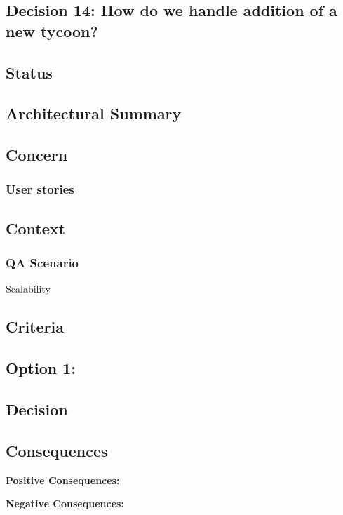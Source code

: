 \subsection{Decision 14: How do we handle addition of a new tycoon?}

\subsection*{Status}

\subsection*{Architectural Summary}


\subsection*{Concern}
\subsubsection*{User stories}

\subsection*{Context}

\subsubsection*{QA Scenario} %
Scalability
\subsection*{Criteria}
\begin{itemize}
\end{itemize}

\subsection*{Option 1:}


\subsection*{Decision}

\subsection*{Consequences}
\textbf{Positive Consequences:}
\begin{itemize}
\end{itemize}
\textbf{Negative Consequences:}
\begin{itemize}
\end{itemize}
